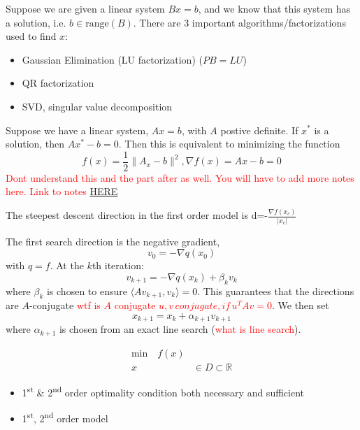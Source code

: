 \begin{definition}
  Suppose we are given a linear system $Bx = b$, and we know that this system has a solution, i.e. $b \in \text{range}(B)$. There are 3 important algorithms/factorizations used to find $x$:
  \begin{itemize}
    \item Gaussian Elimination (LU factorization) ($PB = LU$)
    \item QR factorization
    \item SVD, singular value decomposition
  \end{itemize}
\end{definition}
\begin{problem}
  Suppose we have a linear system, $Ax = b$, with $A$ postive definite. If $x^*$ is a solution, then $Ax^* - b = 0$. Then this is equivalent to minimizing the function $$f(x) = \frac{1}{2} \|A_x - b\|^2, \nabla f(x) = Ax - b = 0$$ \textcolor{red}{Dont understand this and the part after as well. You will have to add more notes here. Link to notes \href{https://cdn-uploads.piazza.com/paste/kcat3sa7dyu2te/bf8109b64a3bff7a1ffbacd0a5d43d03fabf0c01350afdf12f55b5382b6571da/Lecture_6.pdf}{HERE}}
\end{problem}
\begin{definition}
  The steepest descent direction in the first order model is d=-$\frac{\nabla f(x_c)}{|x_c|}$
  
\end{definition}
\begin{theorem}
  The first search direction is the negative gradient, $$v_0 = -\nabla q(x_0)$$ with $q = f$. At the $k$th iteration:
  $$v_{k+1} = -\nabla q(x_k) + \beta_k v_k$$
  where $\beta_k$ is chosen to ensure $\langle Av_{k+1}, v_k \rangle = 0$. This guarantees that the directions are $A$-conjugate \textcolor{red}{wtf is $A$ conjugate $u,v\,conjugate,if\,u^TAv=0$}. We then set $$x_{k+1} = x_k + \alpha_{k+1}v_{k+1}$$ where $\alpha_{k+1}$ is chosen from an exact line search (\textcolor{red}{what is line search}).
\end{theorem}


\begin{problem}
  \begin{align*}
    \text{min} \quad f(x)  \\
    x & \in D \subset \mathbb{R}
    \end{align*}
\end{problem}


\begin{itemize}
\item 1\textsuperscript{st} \& 2\textsuperscript{nd} order optimality condition both necessary and sufficient
\item 1\textsuperscript{st}, 2\textsuperscript{nd} order model
\end{itemize}